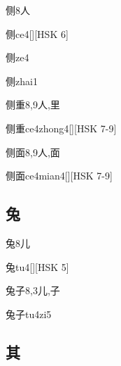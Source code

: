 \begin{Entry}{侧}{8}{⼈}
  \begin{Phonetics}{侧}{ce4}[][HSK 6]
  \end{Phonetics}
  \begin{Phonetics}{侧}{ze4}
  \end{Phonetics}
  \begin{Phonetics}{侧}{zhai1}
  \end{Phonetics}
\end{Entry}

\begin{Entry}{侧重}{8,9}{⼈,⾥}
  \begin{Phonetics}{侧重}{ce4zhong4}[][HSK 7-9]
  \end{Phonetics}
\end{Entry}

\begin{Entry}{侧面}{8,9}{⼈,⾯}
  \begin{Phonetics}{侧面}{ce4mian4}[][HSK 7-9]
  \end{Phonetics}
\end{Entry}

\subsection*{兔}

\begin{Entry}{兔}{8}{⼉}
  \begin{Phonetics}{兔}{tu4}[][HSK 5]
  \end{Phonetics}
\end{Entry}

\begin{Entry}{兔子}{8,3}{⼉,⼦}
  \begin{Phonetics}{兔子}{tu4zi5}
  \end{Phonetics}
\end{Entry}

\subsection*{其}

